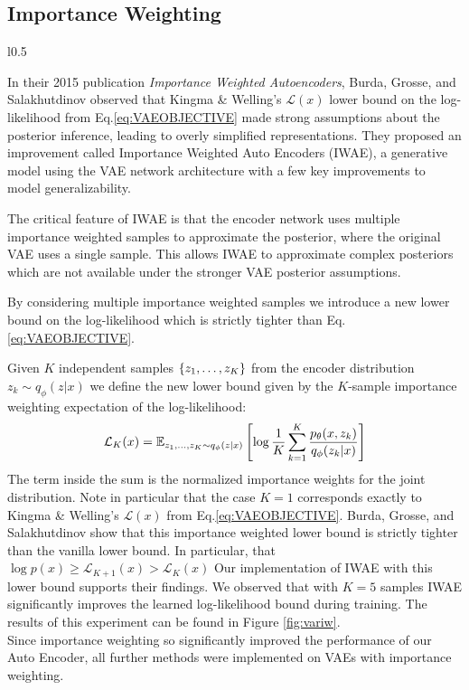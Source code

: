 \documentclass{article} %
\numberwithin{figure}{section}
\renewcommand{\L}{\mathcal{L}}
\begin{document}
\subsection{Importance Weighting}
\begin{wrapfigure}{l}{0.5\textwidth}
  \captionsetup[subfigure]{justification=centering}
  \resizebox{\linewidth}{!}{}
  \caption{Variational v.s. Importance Weighted (IW)}
  \label{fig:variw}
\end{wrapfigure}
In their 2015 publication \textit{Importance Weighted Autoencoders}, Burda, Grosse, and Salakhutdinov observed that Kingma \& Welling's $\L(x)$ lower bound on the log-likelihood from Eq.\ref{eq:VAEOBJECTIVE} made strong assumptions about the posterior inference, leading to overly simplified representations. They proposed an improvement called Importance Weighted Auto Encoders (IWAE), a generative model using the VAE network architecture with a few key improvements to model generalizability.
\par The critical feature of IWAE is that the encoder network uses multiple importance weighted samples to approximate the posterior, where the original VAE uses a single sample. This allows IWAE to approximate complex posteriors which are not available under the stronger VAE posterior assumptions.
\par By considering multiple importance weighted samples we introduce a new lower bound on the log-likelihood which is strictly tighter than Eq.\ref{eq:VAEOBJECTIVE}.
\par Given $K$ independent samples $\{z_1,\mathellipsis,z_K\}$ from the encoder distribution $z_k\sim q_\phi(z|x)$ we define the new lower bound given by the $K$-sample importance weighting expectation of the log-likelihood:
\begin{equation}
   \L_K(x) = \mathbb{E}_{z_1,\mathellipsis,z_K \sim q_\phi(z|x)}\left[\log\frac{1}{K}\sum_{k=1}^{K}\frac{p_\theta(x,z_k)}{q_\phi(z_k|x)}\right]
\end{equation}
The term inside the sum is the normalized importance weights for the joint distribution. Note in particular that the case $K=1$ corresponds exactly to Kingma \& Welling's $\L(x)$ from Eq.\ref{eq:VAEOBJECTIVE}. Burda, Grosse, and Salakhutdinov show that this importance weighted lower bound is strictly tighter than the vanilla lower bound. In particular, that $\log p(x) \geq \L_{K+1}(x)>\L_K(x)$ Our implementation of IWAE with this lower bound supports their findings. We observed that with $K=5$ samples IWAE significantly improves the learned log-likelihood bound during training. The results of this experiment can be found in Figure \ref{fig:variw}. \\
Since importance weighting so significantly improved the performance of our Auto Encoder, all further methods were implemented on VAEs with importance weighting.
\end{document}
